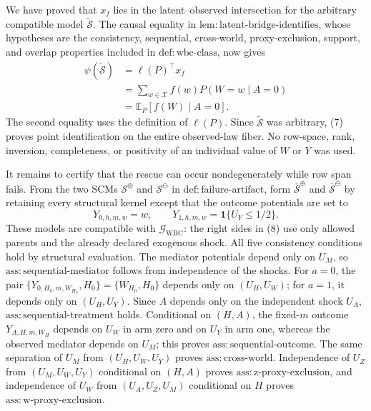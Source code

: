 We have proved that \(x_f\) lies in the latent--observed intersection for the arbitrary compatible model \(\widetilde{\mathcal S}\). The causal equality in \(\mathrm{lem{:}latent\text{-}bridge\text{-}identifies}\), whose hypotheses are the consistency, sequential, cross-world, proxy-exclusion, support, and overlap properties included in \(\mathrm{def{:}wbc\text{-}class}\), now gives
\[
\begin{aligned}
\psi(\widetilde{\mathcal S})
&=\ell(P)^{\top}x_f\\
&=\sum_{w\in\mathcal X}f(w)P(W=w\mid A=0)\\
&=\mathbb E_P[f(W)\mid A=0].
\end{aligned}
\tag{7}
\]
The second equality uses the definition of \(\ell(P)\). Since \(\widetilde{\mathcal S}\) was arbitrary, (7) proves point identification on the entire observed-law fiber. No row-space, rank, inversion, completeness, or positivity of an individual value of \(W\) or \(Y\) was used.

It remains to certify that the rescue can occur nondegenerately while row span fails. From the two SCMs \(\mathcal S^{\oplus}\) and \(\mathcal S^{\ominus}\) in \(\mathrm{def{:}failure\text{-}artifact}\), form \(\overline{\mathcal S}^{\oplus}\) and \(\overline{\mathcal S}^{\ominus}\) by retaining every structural kernel except that the outcome potentials are set to
\[
Y_{0,h,m,w}=w,
\qquad
Y_{1,h,m,w}=\mathbf 1\{U_Y\le 1/2\}.
\tag{8}
\]
These models are compatible with \(\mathcal G_{\mathrm{WBC}}\): the right sides in (8) use only allowed parents and the already declared exogenous shock. All five consistency conditions hold by structural evaluation. The mediator potentials depend only on \(U_M\), so \(\mathrm{ass{:}sequential\text{-}mediator}\) follows from independence of the shocks. For \(a=0\), the pair \(\{Y_{0,H_0,m,W_{H_0}},H_0\}=\{W_{H_0},H_0\}\) depends only on \((U_H,U_W)\); for \(a=1\), it depends only on \((U_H,U_Y)\). Since \(A\) depends only on the independent shock \(U_A\), \(\mathrm{ass{:}sequential\text{-}treatment}\) holds. Conditional on \((H,A)\), the fixed-\(m\) outcome \(Y_{A,H,m,W_H}\) depends on \(U_W\) in arm zero and on \(U_Y\) in arm one, whereas the observed mediator depends on \(U_M\); this proves \(\mathrm{ass{:}sequential\text{-}outcome}\). The same separation of \(U_M\) from \((U_H,U_W,U_Y)\) proves \(\mathrm{ass{:}cross\text{-}world}\). Independence of \(U_Z\) from \((U_M,U_W,U_Y)\) conditional on \((H,A)\) proves \(\mathrm{ass{:}z\text{-}proxy\text{-}exclusion}\), and independence of \(U_W\) from \((U_A,U_Z,U_M)\) conditional on \(H\) proves \(\mathrm{ass{:}w\text{-}proxy\text{-}exclusion}\).

